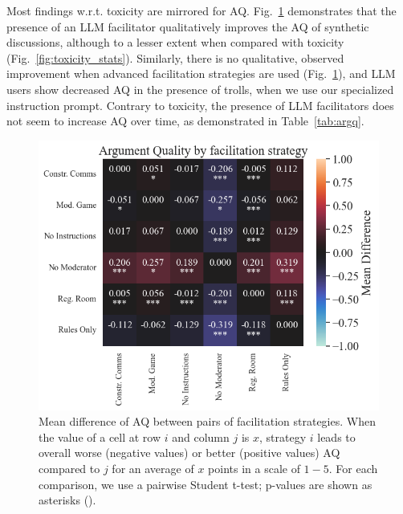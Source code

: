 Most findings w.r.t. toxicity are mirrored for \ac{AQ}. Fig.~\ref{fig:aq_stats} demonstrates that the presence of an \ac{LLM} facilitator qualitatively improves the \ac{AQ} of synthetic discussions, although to a lesser extent when compared with toxicity (Fig.~\ref{fig:toxicity_stats}). Similarly, there is no qualitative, observed improvement when advanced facilitation strategies are used (Fig.~\ref{fig:aq_stats}), and \ac{LLM} users show decreased \ac{AQ} in the presence of trolls, when we use our specialized instruction prompt. Contrary to toxicity, the presence of \ac{LLM} facilitators does not seem to increase \ac{AQ} over time, as demonstrated in Table~\ref{tab:argq}.

\begin{figure}
	\includegraphics[width=\linewidth]{resources/argumentq_stats.png}
	\centering
	\caption{Mean difference of \ac{AQ} between pairs of facilitation strategies. When the value of a cell at row $i$ and column $j$ is $x$, strategy $i$ leads to overall worse (negative values) or better (positive values) \ac{AQ} compared to $j$ for an average of $x$ points in a scale of $1-5$. For each comparison, we use a pairwise Student t-test; p-values are shown as asterisks (\asterisknote).}
	\label{fig:aq_stats}
\end{figure}


